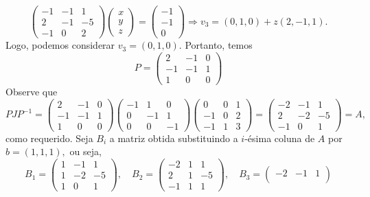 \documentclass[11pt,a4paper]{article}
\begin{document}
{{\[\begin{pmatrix}
-1 & -1 & 1 \\
2 & -1 & -5 \\
-1 & 0 & 2
\end{pmatrix}\begin{pmatrix}
x \\
y \\
z
\end{pmatrix} = \begin{pmatrix}
-1 \\
-1 \\
0
\end{pmatrix} \Rightarrow v_3 = (0,1,0) + z(2,-1,1).
 \]
Logo, podemos considerar $v_3 = (0,1,0).$ Portanto, temos
\[
P = \begin{pmatrix}
2 & -1 & 0 \\
-1 & -1 & 1 \\
1 & 0 & 0
\end{pmatrix}
\]
Observe que
\[
PJP^{-1} = \begin{pmatrix}
2 & -1 & 0 \\
-1 & -1 & 1 \\
1 & 0 & 0
\end{pmatrix} \begin{pmatrix}
-1 & 1 & 0 \\
0 & -1 & 1 \\
0 & 0 & -1 
 \end{pmatrix} \left(\begin{matrix}
0 & 0 & 1 \\
-1 & 0 & 2 \\
-1 & 1 & 3
\end{matrix}\right) = \begin{pmatrix}
-2 & -1 & 1 \\
2 & -2 & -5 \\
-1 & 0 & 1
\end{pmatrix}  = A,
\]
como requerido.
\task[\pers{c}] Seja $B_i$ a matriz obtida substituindo a $i$-ésima coluna de $A$ por $b = (1,1,1),$ ou seja,
\[
B_1 = \begin{pmatrix}
1 & -1 & 1 \\
1 & -2 & -5 \\
1& 0 & 1
\end{pmatrix}, \quad B_2 = \begin{pmatrix}
-2 & 1 & 1 \\
2 & 1 & -5 \\
-1 & 1 & 1
\end{pmatrix}, \quad B_3 = \begin{pmatrix}
-2 & -1 & 1 \\

\end{pmatrix}\]}}
\end{document}
